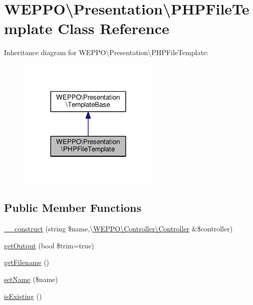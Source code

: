 \hypertarget{classWEPPO_1_1Presentation_1_1PHPFileTemplate}{}\section{W\+E\+P\+PO\textbackslash{}Presentation\textbackslash{}P\+H\+P\+File\+Template Class Reference}
\label{classWEPPO_1_1Presentation_1_1PHPFileTemplate}


Inheritance diagram for W\+E\+P\+PO\textbackslash{}Presentation\textbackslash{}P\+H\+P\+File\+Template\+:\nopagebreak
\begin{figure}[H]
\begin{center}
\leavevmode
\includegraphics[width=192pt]{classWEPPO_1_1Presentation_1_1PHPFileTemplate__inherit__graph}
\end{center}
\end{figure}
\subsection*{Public Member Functions}
\begin{DoxyCompactItemize}
\item 
\hyperlink{classWEPPO_1_1Presentation_1_1PHPFileTemplate_a89afd3c58b8b503c8db68c445b8f03f2}{\+\_\+\+\_\+construct} (string \$name,\textbackslash{}\hyperlink{classWEPPO_1_1Controller_1_1Controller}{W\+E\+P\+P\+O\textbackslash{}\+Controller\textbackslash{}\+Controller} \&\$controller)
\item 
\hyperlink{classWEPPO_1_1Presentation_1_1PHPFileTemplate_a1449e358540d953e2b4e95d4b0f5e1a7}{get\+Output} (bool \$trim=true)
\item 
\hyperlink{classWEPPO_1_1Presentation_1_1PHPFileTemplate_a1f47316aa1b8d5580cca4771ff581225}{get\+Filename} ()
\item 
\hyperlink{classWEPPO_1_1Presentation_1_1PHPFileTemplate_a1efa4f72b3bc4708683a42d8d5e410e2}{set\+Name} (\$name)
\item 
\hyperlink{classWEPPO_1_1Presentation_1_1PHPFileTemplate_a3b31482d62aa3825dca239c4367870eb}{is\+Existing} ()
\end{DoxyCompactItemize}
